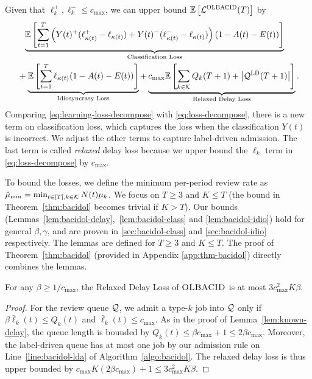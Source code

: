 Given that $\ell_k^{+}, \ell_k^{-} \leq c_{\max}$, we can upper bound $\mathbb E\left[\mathcal{L}^{\textsc{OLBACID}}(T)\right]$ by 
\begin{align}
&\hspace{0.1in}\underbrace{\mathbb E\left[\sum_{t=1}^T \left(Y(t)^+(\ell_{\kappa(t)}^{+} - \ell_{\kappa(t)}) + Y(t)^-(\ell_{\kappa(t)}^{-}-\ell_{\kappa(t)})\right)(1 - A(t) - E(t))\right]}_{\text{Classification Loss}} \nonumber\\
&+  \underbrace{\mathbb E\left[\sum_{t=1}^T  \ell_{\kappa(t)}(1 - A(t) - E(t))\right]}_{\text{Idiosyncrasy Loss}} +\underbrace{c_{\max}\mathbb E\left[\sum_{k \in \mathcal{K}} Q_k(T+1) + \left|\mathcal{Q}^{\mathcal{\textsc{LD}}}(T+1)\right|\right]}_{\text{Relaxed Delay Loss}}.\label{eq:learning-loss-decompose}
\end{align}
Comparing \eqref{eq:learning-loss-decompose} with \eqref{eq:loss-decompose}, there is a new term on classification loss, which captures the loss when the classification $Y(t)$ is incorrect. We adjust the other terms to capture label-driven admission. The last term is called \emph{relaxed} delay loss because we upper bound the $\ell_k$ term in \eqref{eq:loss-decompose} by $c_{\max}.$

To bound the losses, we define  the minimum per-period review rate as $\hat{\mu}_{\min} = \min_{t \in [T], k \in \mathcal{K}} N(t)\mu_k$. We focus on $T \geq 3$ and $K \leq T$ (the bound in Theorem~\ref{thm:bacidol} becomes trivial if $K > T$). Our bounds (Lemmas~\ref{lem:bacidol-delay},~\ref{lem:bacidol-class} and \ref{lem:bacidol-idio}) hold for general $\beta, \gamma$, and are proven in \ref{sec:bacidol-class} and \ref{sec:bacidol-idio} respectively. The lemmas are defined for $T \geq 3$ and $K \leq T$. The proof of Theorem~\ref{thm:bacidol} (provided in Appendix \ref{app:thm-bacidol}) directly combines the lemmas.
\begin{lemma}\label{lem:bacidol-delay}
For any $\beta \geq 1 / c_{\max}$, the Relaxed Delay Loss of $\textsc{OLBACID}$ is at most $3c^2_{\max} K\beta .$
\end{lemma}
\begin{proof}
For the review queue $\mathcal{Q}$, we admit a type-$k$ job into $\mathcal{Q}$ only if $\beta \bar{\ell}_k(t)\leq Q_k(t)$ and $\bar{\ell}_k(t) \leq c_{\max}$. As in the proof of Lemma~\ref{lem:known-delay}, the queue length is bounded by $Q_k(t) \leq \beta c_{\max} + 1 \leq 2\beta c_{\max}$. Moreover, the label-driven queue has at most one job by our admission rule on Line~\ref{line:bacidol-lda} of Algorithm~\ref{algo:bacidol}. The relaxed delay loss is thus upper bounded by $c_{\max}K(2\beta c_{\max}) + 1 \leq 3c^2_{\max}K\beta.$
\end{proof}

